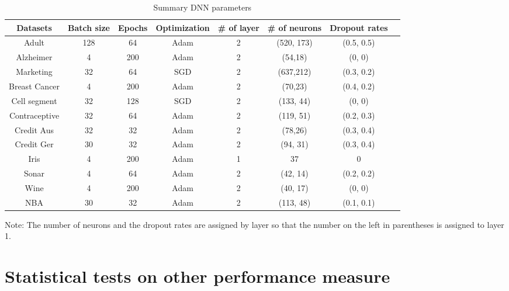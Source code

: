 \documentclass[a4paper,12pt]{article}
\numberwithin{equation}{section}
\begin{document}
\begin{appendices}
\begin{table}[H]
\begin{center}
\caption{Summary DNN parameters}
\begin{threeparttable}
\begin{tabular}{ |c|c|c|c|c|c|c|c| } 
 \hline
 Datasets & Batch size & Epochs & Optimization & \# of layer & \# of neurons & Dropout rates \\\hline 
\hline 
 Adult & 128 & 64 & Adam & 2 & (520, 173) &(0.5, 0.5)  \\[1pt]
 Alzheimer & 4 & 200 & Adam & 2 & (54,18)  & (0, 0) \\[1pt]
 Marketing & 32 & 64 & SGD & 2 & (637,212) & (0.3, 0.2)  \\[1pt] 
 Breast Cancer & 4 & 200 & Adam & 2 & (70,23) & (0.4, 0.2)\\[1pt]
 Cell segment & 32 & 128 & SGD & 2 & (133, 44) & (0, 0) \\[1pt]
 Contraceptive & 32 & 64 & Adam & 2 & (119, 51) & (0.2, 0.3)   \\[1pt]
 Credit Aus & 32 & 32 & Adam & 2 & (78,26) & (0.3, 0.4)  \\[1pt]
 Credit Ger & 30 & 32 & Adam & 2 & (94, 31) & (0.3, 0.4)\\[1pt]
 Iris & 4 & 200 & Adam & 1 & 37 & 0 \\[1pt]
 Sonar & 4 & 64 & Adam & 2 & (42, 14) & (0.2, 0.2)  \\[1pt]
 Wine & 4 & 200& Adam &  2 & (40, 17) & (0, 0)\\[1pt]
 NBA & 30 & 32 & Adam & 2 & (113, 48) & (0.1, 0.1)  \\[1pt]
 \hline



 \hline
\end{tabular}
\begin{tablenotes}
\small
\item   Note: The number of neurons and the dropout rates are assigned by layer so that the number on the left in parentheses is assigned to layer 1. 
\end{tablenotes}
\end{threeparttable}
\label{table: 8}
\end{center}
\end{table}



\section{Statistical tests on other performance measure}



\end{appendices}
\end{document}

